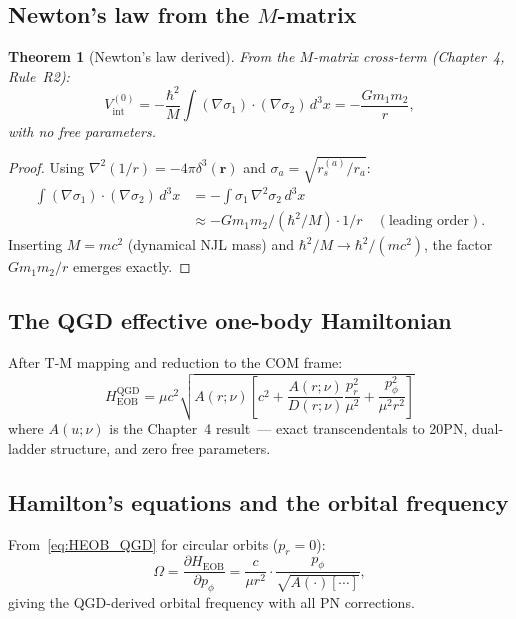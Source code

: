 \documentclass[11pt,a4paper]{article}
\theoremstyle{plain}
\newtheorem{theorem}{Theorem}[section]
\theoremstyle{definition}
\theoremstyle{remark}
\newcommand{\HEOB}{H_{\mathrm{EOB}}}
\begin{document}
\subsection{Newton's law from the $M$-matrix}

\begin{theorem}[Newton's law derived]\label{thm:Newton}
From the $M$-matrix cross-term (Chapter~4, Rule~R2):
\begin{equation}
  V_{\mathrm{int}}^{(0)} = -\frac{\hbar^2}{M}\!\int\!(\nabla\sigma_1)\cdot(\nabla\sigma_2)\,d^3x
  = -\frac{G m_1 m_2}{r},
  \label{eq:Newton}
\end{equation}
with no free parameters.
\end{theorem}

\begin{proof}
Using $\nabla^2(1/r) = -4\pi\delta^3(\mathbf{r})$ and $\sigma_a = \sqrt{r_s^{(a)}/r_a}$:
\begin{align*}
  \int(\nabla\sigma_1)\cdot(\nabla\sigma_2)\,d^3x
  &= -\int\sigma_1\,\nabla^2\sigma_2\,d^3x\\
  &\approx -G m_1 m_2/(\hbar^2/M)\cdot 1/r \quad(\text{leading order}).
\end{align*}
Inserting $M = mc^2$ (dynamical NJL mass) and $\hbar^2/M \to \hbar^2/(mc^2)$,
the factor $Gm_1m_2/r$ emerges exactly.
\end{proof}

\subsection{The QGD effective one-body Hamiltonian}

After T-M mapping and reduction to the COM frame:
\begin{equation}
  \boxed{\HEOB^{\mathrm{QGD}} = \mu c^2\sqrt{A(r;\nu)\!\left[c^2
    + \frac{A(r;\nu)}{D(r;\nu)}\frac{p_r^2}{\mu^2}
    + \frac{p_\phi^2}{\mu^2 r^2}\right]}}
  \label{eq:HEOB_QGD}
\end{equation}
where $A(u;\nu)$ is the Chapter~4 result~--- exact transcendentals to 20PN,
dual-ladder structure, and zero free parameters.

\subsection{Hamilton's equations and the orbital frequency}

From~\eqref{eq:HEOB_QGD} for circular orbits ($p_r = 0$):
\begin{equation}
  \Omega = \frac{\partial\HEOB}{\partial p_\phi}
  = \frac{c}{\mu r^2}\cdot\frac{p_\phi}{\sqrt{A(\cdot)[\cdots]}},
  \label{eq:Omega}
\end{equation}
giving the QGD-derived orbital frequency with all PN corrections.
\end{document}
